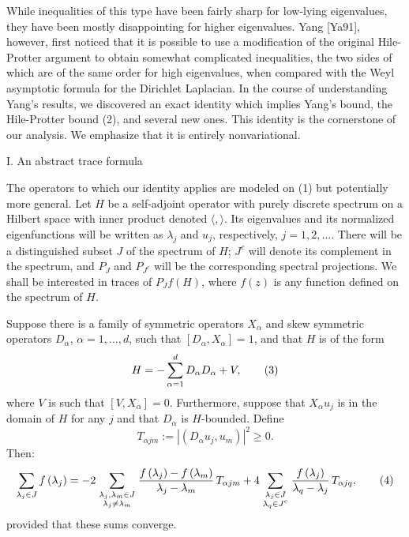 While inequalities of this type have been fairly sharp for low-lying 
eigenvalues, they have been mostly disappointing for higher eigenvalues.  
Yang [Ya91], however, first noticed that it is possible to use a modification 
of the original Hile-Protter argument to obtain somewhat complicated 
inequalities, the two sides of which are of the same order for high 
eigenvalues, when compared with the Weyl asymptotic formula for the 
Dirichlet Laplacian.  In the course of understanding Yang's results, we 
discovered an exact identity which implies Yang's bound, the Hile-Protter 
bound (2), and several new ones.  This identity is the cornerstone of our 
analysis.  We emphasize that it is entirely nonvariational.

\head I.  An abstract trace formula\endhead

The operators to which our identity applies are modeled on (1) but 
potentially more general.  Let $H$ be a self-adjoint operator with purely 
discrete spectrum on a Hilbert space with inner product denoted 
$\langle,\rangle$.  Its 
eigenvalues and its normalized eigenfunctions will be written as 
$\lambda_{j}$ and $u_j$, respectively, $j = 1,2,\dots$.  There will be a 
distinguished subset $J$ of the spectrum of $H$; $J^c$ 
will denote its complement 
in the spectrum, and $P_J$ and $P_{J^c}$ will be the corresponding spectral 
projections.  We shall be interested in traces of  
$P_J f(H)$, where $f(z)$ is any 
function defined on the spectrum of $H$.

Suppose there is a family of symmetric operators $X_{\alpha}$ 
and skew symmetric operators  $D_{\alpha}$, 
$\alpha = 1, \dots, d$, such that  
$[D_{\alpha},X_{\alpha}] = 1$,  and that $H$ is of the form
$$
H =   - \sum_{\alpha=1}^d D_{\alpha}D_{\alpha}    +      
V,   \tag 3
$$
where $V$ is such that  $[V,X_{\alpha}] = 0$.  
Furthermore, suppose that 
$X_{\alpha}u_j$ is in the domain of $H$ for any 
$j$ and that $D_{\alpha}$ is 
$H$-bounded.  Define 
$$T_{\alpha jm} := |(D_{\alpha} u_j, u_m)|^2    \ge   0.$$
Then:
$$
\sum\limits_{\lambda_j\in J} f\left(\lambda_j\right)
= -2\sum\limits_{\scriptstyle\lambda_j,\lambda 
_m\in J\atop
\scriptstyle\lambda_j\ne \lambda_m}
{f\left(\lambda _j\right) - f\left(\lambda_m\right) 
\over\lambda_j-\lambda _m}\,
{T}_{\alpha jm}+4\sum\limits_{\scriptstyle\lambda _j\in J\atop
\scriptstyle\lambda_q\in J^c}
{f\left({{\lambda }_{j}}\right) 
\over {\lambda }_{q}-{\lambda }_{j}}\,{T}_{\alpha jq} , 
\tag 4 $$
provided that these sums converge.
\endproclaim 

